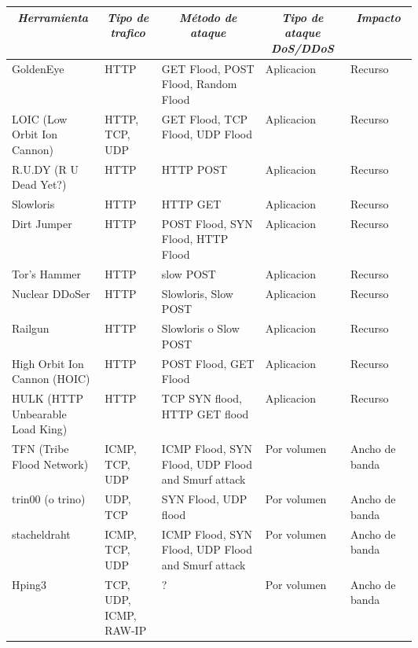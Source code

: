 \documentclass[12pt]{article}
\begin{document}
\begin{table}[htbp]
\tiny
\centering
\begin{tabular}{|p{0.1\linewidth}|p{0.1\linewidth}|p{0.2\linewidth}|p{0.1\linewidth}|p{0.1\linewidth}|}\hline
\multicolumn{1}{|c|}{\textit{\textbf{Herramienta}}} & 
\multicolumn{1}{c|}{\textit{\textbf{Tipo de trafico}}} &
\multicolumn{1}{|c|}{\textit{\textbf{Método de ataque}}} & 
\multicolumn{1}{|c|}{\textit{\textbf{Tipo de ataque DoS/DDoS}}} &
\multicolumn{1}{|c|}{\textit{\textbf{Impacto}}} \tabularnewline \hline

GoldenEye &
HTTP & 
GET Flood, POST Flood, Random Flood  & 
Aplicacion & 
Recurso
\tabularnewline \hline

LOIC (Low Orbit Ion Cannon) &
HTTP, TCP, UDP & 
GET Flood, TCP Flood, UDP Flood  & 
Aplicacion & 
Recurso
\tabularnewline \hline

R.U.DY (R U Dead Yet?) &
HTTP & 
HTTP POST  & 
Aplicacion & 
Recurso
\tabularnewline \hline

Slowloris &
HTTP & 
HTTP GET   & 
Aplicacion & 
Recurso
\tabularnewline \hline

Dirt Jumper &
HTTP & 
POST Flood, SYN Flood, HTTP Flood & 
Aplicacion & 
Recurso
\tabularnewline \hline

Tor’s Hammer &
HTTP & 
slow POST & 
Aplicacion & 
Recurso
\tabularnewline \hline

Nuclear DDoSer &
HTTP & 
Slowloris, Slow POST & 
Aplicacion & 
Recurso
\tabularnewline \hline

Railgun &
HTTP & 
Slowloris o Slow POST & 
Aplicacion & 
Recurso
\tabularnewline \hline

High Orbit Ion Cannon (HOIC) &
HTTP & 
POST Flood, GET Flood & 
Aplicacion & 
Recurso
\tabularnewline \hline

HULK (HTTP Unbearable Load King) &
HTTP & 
TCP SYN flood, HTTP GET flood & 
Aplicacion & 
Recurso
\tabularnewline \hline

TFN (Tribe Flood Network) &
ICMP, TCP, UDP & 
ICMP Flood, SYN Flood, UDP Flood and Smurf attack & 
Por volumen & 
Ancho de banda
\tabularnewline \hline

trin00 (o trino) &
UDP, TCP & 
SYN Flood, UDP flood & 
Por volumen & 
Ancho de banda
\tabularnewline \hline

stacheldraht &
ICMP, TCP, UDP & 
ICMP Flood, SYN Flood, UDP Flood and Smurf attack & 
Por volumen & 
Ancho de banda
\tabularnewline \hline

Hping3 &
TCP, UDP, ICMP, RAW-IP & 
? & 
Por volumen & 
Ancho de banda
\tabularnewline \hline


\end{tabular}
\end{table}
\end{document}
